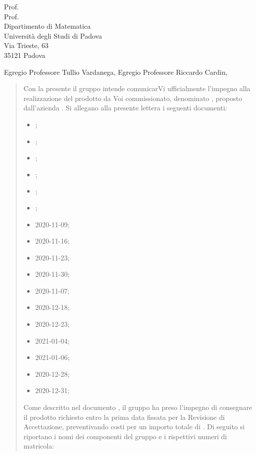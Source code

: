\documentclass[a4paper,12pt]{letteracdp}
\date{11 gennaio 2021}
\begin{document}
\begin{letter}{
	Prof. \Tullio{} \\
	Prof. \Riccardo{} \\
	Dipartimento di Matematica \\
	Università degli Studi di Padova \\
	Via Trieste, 63 \\
	35121 Padova}
	
\opening{Egregio Professore Tullio Vardanega, \newline
Egregio Professore Riccardo Cardin,}

\begin{quotation}
	\noindent 
	Con la presente il gruppo \gruppo{} intende comunicarVi ufficialmente l'impegno alla realizzazione del prodotto da Voi commissionato, denominato \progetto{}, proposto dall’azienda \proponente.\newline
	Si allegano alla presente lettera i seguenti documenti:
	\begin{itemize}
		\item \docSdF{}\versSdF;
		\item \docAdR{}\versAdR;
		\item \docG{}\versGlo;
		\item \docNdP{}\versNdP;
		\item \docPdP{}\versPdP;
		\item \docPdQ{}\versPdQ;
		\item \docVI{}2020-11-09;
		\item \docVI{}2020-11-16;
		\item \docVI{}2020-11-23;
		\item \docVI{}2020-11-30;
		\item \docVI{}2020-11-07;
		\item \docVI{}2020-12-18;
		\item \docVI{}2020-12-23;
		\item \docVI{}2021-01-04;
		\item \docVI{}2021-01-06;
		\item \docVE{}2020-12-28;
		\item \docVE{}2020-12-31;
		
	\end{itemize}
Come descritto nel documento \docPdP{}\versPdP{}, il gruppo \gruppo{} ha preso l'impegno di consegnare il prodotto richiesto entro la prima data fissata per la Revisione di Accettazione, preventivando costi per un importo totale di \textbf{}. \newline
Di seguito si riportano i nomi dei componenti del gruppo e i rispettivi numeri di matricola:
	

\end{quotation}
\end{letter}
\end{document}
